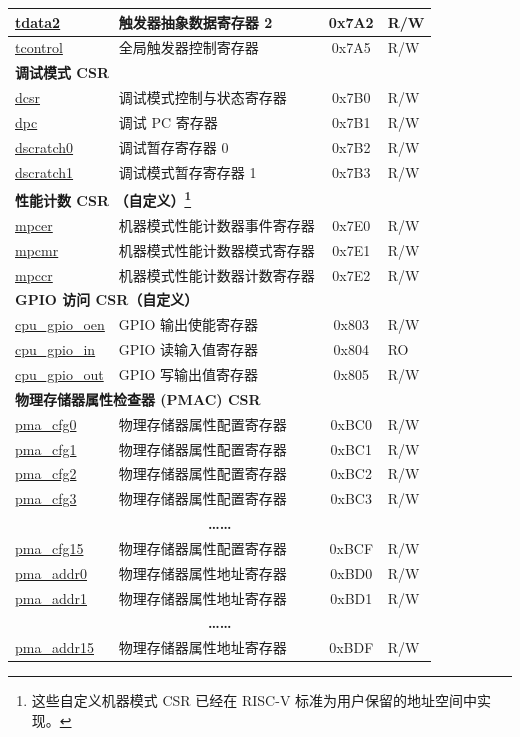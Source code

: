 \begin{longtable}{ | p{4.0cm} | p{8.4cm} | c | l | }
\hyperref[regdesc:TDATA2]{tdata2} & 触发器抽象数据寄存器 2 & 0x7A2 & R/W \\\hline
\hyperref[regdesc:TCONTROL]{tcontrol} & 全局触发器控制寄存器 & 0x7A5 & R/W \\\hline
\multicolumn{4}{|l|}{\textbf{调试模式 CSR}} \\\hline
\hyperref[regdesc:DCSR]{dcsr} & 调试模式控制与状态寄存器  & 0x7B0 & R/W \\\hline
\hyperref[regdesc:DPC]{dpc} & 调试 PC 寄存器 & 0x7B1 & R/W \\\hline
\hyperref[regdesc:DSCRATCH0]{dscratch0} & 调试暂存寄存器 0 & 0x7B2 & R/W \\\hline
\hyperref[regdesc:DSCRATCH1]{dscratch1} & 调试模式暂存寄存器 1 & 0x7B3 & R/W \\\hline
\multicolumn{4}{|l|}{\textbf{性能计数 CSR （自定义）\footnote{这些自定义机器模式 CSR 已经在 RISC-V 标准为用户保留的地址空间中实现。}}} \\\hline
\hyperref[regdesc:MPCER]{mpcer} & 机器模式性能计数器事件寄存器 & 0x7E0 & R/W \\\hline
\hyperref[regdesc:MPCMR]{mpcmr} & 机器模式性能计数器模式寄存器 & 0x7E1 & R/W \\\hline
\hyperref[regdesc:MPCCR]{mpccr} & 机器模式性能计数器计数寄存器 & 0x7E2 & R/W \\\hline
\multicolumn{4}{|l|}{\textbf{GPIO 访问 CSR（自定义）}} \\\hline
\hyperref[regdesc:GPIO_OEN]{cpu\_gpio\_oen} & GPIO 输出使能寄存器 & 0x803 & R/W \\\hline
\hyperref[regdesc:GPIO_IN]{cpu\_gpio\_in} & GPIO 读输入值寄存器 & 0x804 & RO \\\hline
\hyperref[regdesc:GPIO_OUT]{cpu\_gpio\_out} & GPIO 写输出值寄存器 & 0x805 & R/W \\\hline
\multicolumn{4}{|l|}{\textbf{物理存储器属性检查器 (PMAC) CSR}} \\\hline
\hyperref[sec:riscvcpu-pma-reg-desc]{pma\_cfg0} & 物理存储器属性配置寄存器 & 0xBC0 & R/W \\\hline
\hyperref[sec:riscvcpu-pma-reg-desc]{pma\_cfg1} & 物理存储器属性配置寄存器 & 0xBC1 & R/W \\\hline
\hyperref[sec:riscvcpu-pma-reg-desc]{pma\_cfg2} & 物理存储器属性配置寄存器 & 0xBC2 & R/W \\\hline
\hyperref[sec:riscvcpu-pma-reg-desc]{pma\_cfg3} & 物理存储器属性配置寄存器 & 0xBC3 & R/W \\\hline
\multicolumn{4}{|c|}{\textbf{……}} \\\hline
\hyperref[sec:riscvcpu-pma-reg-desc]{pma\_cfg15} & 物理存储器属性配置寄存器 & 0xBCF & R/W \\\hline
\hyperref[sec:riscvcpu-pma-reg-desc]{pma\_addr0} & 物理存储器属性地址寄存器 & 0xBD0 & R/W \\\hline
\hyperref[sec:riscvcpu-pma-reg-desc]{pma\_addr1} & 物理存储器属性地址寄存器 & 0xBD1 & R/W \\\hline
\multicolumn{4}{|c|}{\textbf{……}} \\\hline
\hyperref[sec:riscvcpu-pma-reg-desc]{pma\_addr15} & 物理存储器属性地址寄存器 & 0xBDF & R/W \\\hline

\end{longtable}
